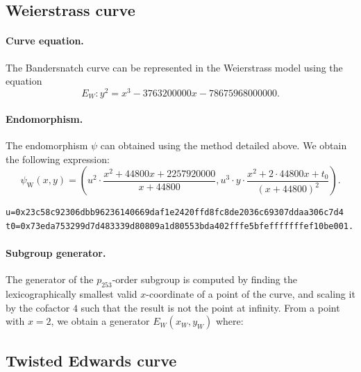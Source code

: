 \documentclass{article}
\theoremstyle{definition}
\newtheorem*{remark}{Remark}
\begin{document}
\subsection{Weierstrass curve}\label{sec-w-curve}
\paragraph{Curve equation.}
The Bandersnatch curve can be represented in the Weierstrass model
using the equation
$$E_W:y^2 = x^3 -3763200000x -78675968000000.$$


\paragraph{Endomorphism.}
The endomorphism $\psi$ can obtained using the method detailed above.
We obtain the following expression:
$$\psi_\text{W}(x,y) = \left(u^2\cdot \frac{x^2+44800x+2257920000}{x+44800}, u^3\cdot
y\cdot \frac{x^2+2\cdot 44800x+t_0}{(x+44800)^2}\right).$$
\begin{verbatim}
u=0x23c58c92306dbb96236140669daf1e2420ffd8fc8de2036c69307ddaa306c7d4
t0=0x73eda753299d7d483339d80809a1d80553bda402fffe5bfefffffffef10be001.
\end{verbatim}

\paragraph{Subgroup generator.}
The generator of the $p_{253}$-order subgroup is computed by finding the
lexicographically smallest valid $x$-coordinate of a point of the
curve, and scaling it by the cofactor $4$ such that the result is not
the point at infinity. From a point with $x=2$, we obtain a generator $E_W(x_W,y_W)$ where:


\subsection{Twisted Edwards curve}
\end{document}
